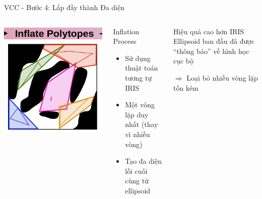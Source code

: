 \documentclass[aspectratio=169]{beamer}
\begin{document}
\begin{frame}{VCC - Bước 4: Lấp đầy thành Đa diện}
    \begin{columns}[c]
        \centering
        \includegraphics[width=\textwidth]{imgs/VCC-4.png}

        \begin{block}{Inflation Process}
            \small
            \begin{itemize}
                \item Sử dụng thuật toán tương tự IRIS
                \item Một vòng lặp duy nhất (thay vì nhiều vòng)
                \item Tạo đa diện lồi cuối cùng từ ellipsoid
            \end{itemize}
        \end{block}

        \begin{alertblock}{Hiệu quả cao hơn IRIS}
            \small
            Ellipsoid ban đầu đã được ``thông báo'' về hình học cục bộ
            
            \vspace{0.2cm}
            $\Rightarrow$ Loại bỏ nhiều vòng lặp tốn kém
        \end{alertblock}
    \end{columns}
\end{frame}
\end{document}
